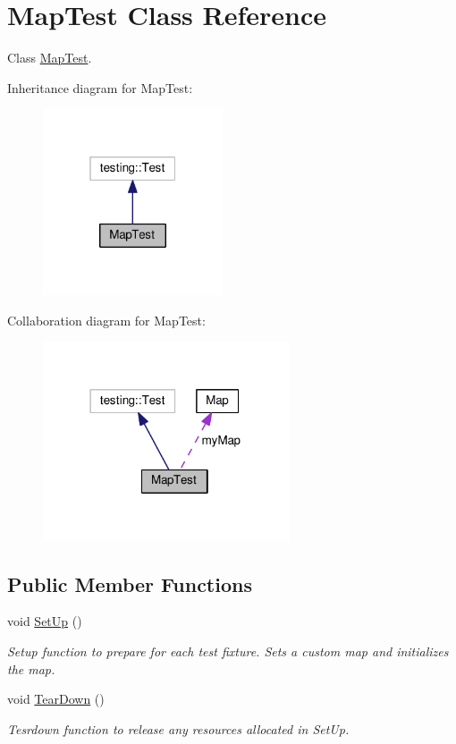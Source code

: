 \hypertarget{classMapTest}{}\section{Map\+Test Class Reference}
\label{classMapTest}


Class \hyperlink{classMapTest}{Map\+Test}.  




Inheritance diagram for Map\+Test\+:
\nopagebreak
\begin{figure}[H]
\begin{center}
\leavevmode
\includegraphics[width=151pt]{classMapTest__inherit__graph}
\end{center}
\end{figure}


Collaboration diagram for Map\+Test\+:
\nopagebreak
\begin{figure}[H]
\begin{center}
\leavevmode
\includegraphics[width=207pt]{classMapTest__coll__graph}
\end{center}
\end{figure}
\subsection*{Public Member Functions}
\begin{DoxyCompactItemize}
\item 
void \hyperlink{classMapTest_a24e2117680abf39f0a8c87c7fffa45fd}{Set\+Up} ()
\begin{DoxyCompactList}\small\item\em Setup function to prepare for each test fixture. Sets a custom map and initializes the map. \end{DoxyCompactList}\item 
void \hyperlink{classMapTest_a4114fafbb5db18eb0052123d062ba18a}{Tear\+Down} ()
\begin{DoxyCompactList}\small\item\em Tesrdown function to release any resources allocated in Set\+Up. \end{DoxyCompactList}\end{DoxyCompactItemize}
